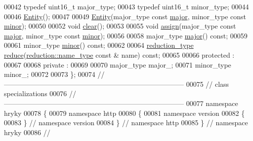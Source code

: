 \begin{DoxyCode}
00042     \textcolor{keyword}{typedef} uint16\_t                    major\_type;
00043     \textcolor{keyword}{typedef} uint16\_t                    minor\_type;
00044     
00046     \hyperlink{classhryky_1_1http_1_1version_1_1_entity_ac19b58d9064e89114e8d3fa85ffdb3ba}{Entity}();
00047 
00049     \hyperlink{classhryky_1_1http_1_1version_1_1_entity_ac19b58d9064e89114e8d3fa85ffdb3ba}{Entity}(major\_type \textcolor{keyword}{const} \hyperlink{classhryky_1_1http_1_1version_1_1_entity_ac64b377083289ff986525ddba6f8d96b}{major}, minor\_type \textcolor{keyword}{const} \hyperlink{classhryky_1_1http_1_1version_1_1_entity_acdc34bd9d3ceac4971d12058cba3b336}{minor});
00050 
00052     \textcolor{keywordtype}{void} \hyperlink{classhryky_1_1http_1_1version_1_1_entity_a0863b378f7a8bd4eb706ef353246ebe6}{clear}();
00053 
00055     \textcolor{keywordtype}{void} \hyperlink{classhryky_1_1http_1_1version_1_1_entity_a4ef617b2be607c93770c82e6d3a02820}{assign}(major\_type \textcolor{keyword}{const} \hyperlink{classhryky_1_1http_1_1version_1_1_entity_ac64b377083289ff986525ddba6f8d96b}{major}, minor\_type \textcolor{keyword}{const} \hyperlink{classhryky_1_1http_1_1version_1_1_entity_acdc34bd9d3ceac4971d12058cba3b336}{minor});
00056 
00058     major\_type \hyperlink{classhryky_1_1http_1_1version_1_1_entity_ac64b377083289ff986525ddba6f8d96b}{major}() \textcolor{keyword}{const};
00059 
00061     minor\_type \hyperlink{classhryky_1_1http_1_1version_1_1_entity_acdc34bd9d3ceac4971d12058cba3b336}{minor}() \textcolor{keyword}{const};
00062 
00064     \hyperlink{classhryky_1_1_intrusive_ptr}{reduction_type} \hyperlink{classhryky_1_1http_1_1version_1_1_entity_ad42fcba159117f025b3b9b34c367fdf5}{reduce}(\hyperlink{classhryky_1_1reduction_1_1_string}{reduction::name_type} \textcolor{keyword}{const} & name) \textcolor{keyword}{const};
00065 
00066 \textcolor{keyword}{protected} :
00067 
00068 \textcolor{keyword}{private} :
00069 
00070     major\_type  major\_;
00071     minor\_type  minor\_;
00072 
00073 \};
00074 \textcolor{comment}{//
      ------------------------------------------------------------------------------}
00075 \textcolor{comment}{// class specializations}
00076 \textcolor{comment}{//
      ------------------------------------------------------------------------------}
00077 \textcolor{keyword}{namespace }hryky
00078 \{
00079 \textcolor{keyword}{namespace }http
00080 \{
00081 \textcolor{keyword}{namespace }version
00082 \{
00083 \} \textcolor{comment}{// namespace version}
00084 \} \textcolor{comment}{// namespace http}
00085 \} \textcolor{comment}{// namespace hryky}
00086 \textcolor{comment}{//
}
\end{DoxyCode}
